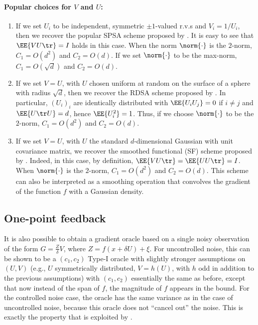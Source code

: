 \paragraph{Popular choices for $V$ and $U$:}
\begin{enumerate}[\bfseries (i)]
 \item If we set $U_i$ to be independent, symmetric $\pm 1$-valued r.v.s and $V_i = 1/U_i$, then we recover the popular SPSA scheme proposed by \cite{spall1992multivariate}.
It is easy to see that $\EE{  V U\tr } = I$ holds in this case.
 When the norm $\norm{\cdot}$ is the $2$-norm, $C_1 = O(d^2)$ and $C_2 = O(d)$. If we set $\norm{\cdot}$ to be the max-norm, $C_1 = O(\sqrt{d})$ and $C_2 = O(d)$.
 \item If we set $V=U$, with $U$ chosen uniform at random on the surface of a sphere with radius $\sqrt{d}$, 
 then we recover the RDSA scheme proposed by  \citeauthor{kushcla} \citep[cf. pp.~58--60][]{kushcla}. 
 In particular, $(U_i)_i$ are identically distributed with $\EE{ U_i U_j } = 0$ if $i\ne j$ and $\EE{ U\tr U } = d$, hence $\EE{U_i^2} = 1$. Thus, if we choose $\norm{\cdot}$ to be the $2$-norm, $C_1 = O( d^2 )$ and $C_2 = O(d)$.
 \item If we set $V=U$, with $U$ the standard $d$-dimensional Gaussian with unit covariance matrix, we recover the smoothed functional (SF) scheme proposed by \cite{katkul}. 
Indeed, in this case, by definition, $\EE{VU\tr} = \EE{U U\tr } = I$.
When $\norm{\cdot}$ is the $2$-norm, $C_1 = O(d^2)$
 and $C_2 = O( d)$.
 This scheme can also be interpreted as a smoothing operation that  convolves the gradient of the function $f$ with a Gaussian density.
\end{enumerate}

\subsection{One-point feedback}
It is also possible to obtain a gradient oracle based on a single noisy observation
of the form $G = \frac{Z}{\delta}V$, where $Z = f(x+\delta U) + \xi$. 
For uncontrolled noise, this can be shown to be a $(c_1,c_2)$ Type-I oracle with slightly stronger assumptions on $(U,V)$ (e.g., $U$ symmetrically distributed, $V = h(U)$, with $h$ odd in addition to the previous assumptions)
with $(c_1,c_2)$ essentially the same as before, except that now instead of the span of $f$, the magnitude of $f$ appears in the bound. For the controlled noise case, the oracle has the same variance as in the case of uncontrolled noise, because this oracle does not ``cancel out'' the noise.%
This is exactly the property that is exploited by \cite{duchi2015optimal}.

